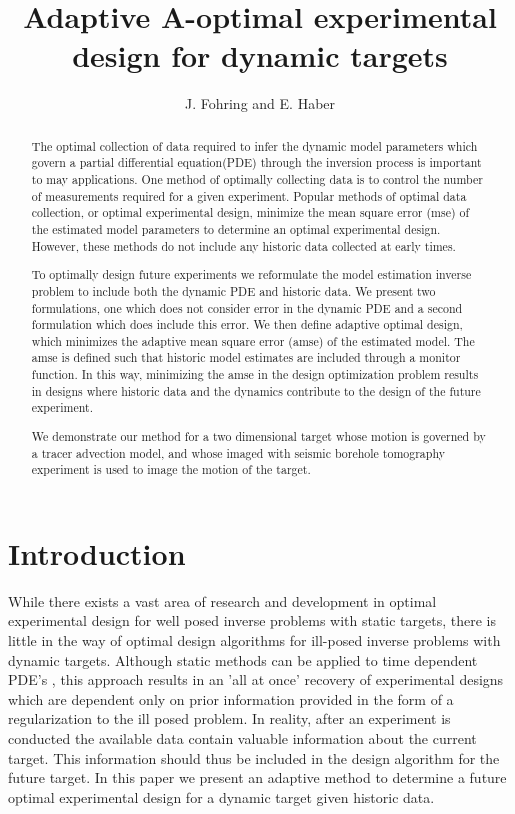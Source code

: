 \documentclass[11pt]{article}
\begin{document}
\title{ Adaptive A-optimal experimental design for dynamic targets}
\author{J. Fohring and E. Haber }
\maketitle


\begin{abstract}
The optimal collection of data required to infer the dynamic model parameters which govern a partial differential equation(PDE) through the inversion process is important to may applications. 
One method of optimally collecting data is to control the number of measurements required for a given experiment. Popular methods of optimal data collection, or optimal experimental design, minimize the mean square error (mse)  of the estimated model parameters to determine an optimal experimental design. However, these methods do not include any historic data collected at early times. 

 To optimally design future experiments we reformulate the model estimation inverse problem to include both the dynamic PDE and historic data. We present two formulations, one which does not consider error in the dynamic PDE and a second formulation which does include this error. We then define  adaptive optimal design, which minimizes the adaptive  mean square error (amse) of the estimated model. The amse is defined such that historic model estimates are included through a monitor function. In this way, minimizing the amse in the design optimization problem results in designs where historic  data and the dynamics contribute to the design of the future experiment.

We demonstrate our method for a two dimensional target whose motion is governed by a tracer advection model, and whose imaged with seismic borehole tomography experiment is used to image the motion of the target.  
 


\end{abstract}


\section{Introduction}
 While there exists a vast area of research and development in optimal experimental design for well posed inverse problems with static targets, there is little in the way of optimal design algorithms for ill-posed inverse problems with dynamic targets. Although static methods can be applied to time dependent PDE's \cite{Alexanderian2014}, this approach results in an 'all at once' recovery of experimental designs which are dependent only on prior information provided in the form of a regularization to the ill posed problem. In reality, after an experiment is conducted the available data contain valuable information about the current target. This information should thus be included in the design algorithm for the future target. In this paper we present an adaptive method to determine a future optimal experimental design for a dynamic target given historic data.
 
\end{document}
